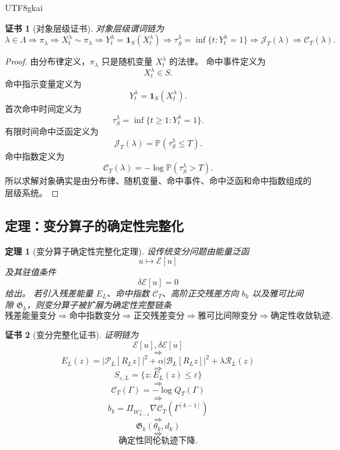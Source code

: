 \documentclass[12pt]{article}
\newtheorem{theorem}{定理}[section]
\newtheorem{Certificate}{证书}[section]
\begin{document}
\begin{CJK*}{UTF8}{gkai}
\begin{Certificate}[对象层级证书]
\label{cert:tex55-object-hierarchy-value}
对象层级谓词链为
\[
  \lambda\in\Lambda
  \Longrightarrow
  \pi_\lambda
  \Longrightarrow
  X_t^\lambda\sim\pi_\lambda
  \Longrightarrow
  Y_t^\lambda=\mathbf 1_S(X_t^\lambda)
  \Longrightarrow
  \tau_S^\lambda=\inf\{t:Y_t^\lambda=1\}
  \Longrightarrow
  \mathcal J_T(\lambda)
  \Longrightarrow
  \mathcal C_T(\lambda).
\]
\end{Certificate}

\begin{proof}
由分布律定义，\(\pi_\lambda\) 只是随机变量 \(X_t^\lambda\) 的法律。
命中事件定义为
\[
  X_t^\lambda\in S.
\]
命中指示变量定义为
\[
  Y_t^\lambda=\mathbf 1_S(X_t^\lambda).
\]
首次命中时间定义为
\[
  \tau_S^\lambda=\inf\{t\ge1:Y_t^\lambda=1\}.
\]
有限时间命中泛函定义为
\[
  \mathcal J_T(\lambda)=\mathbb P(\tau_S^\lambda\le T).
\]
命中指数定义为
\[
  \mathcal C_T(\lambda)=-\log\mathbb P(\tau_S^\lambda>T).
\]
所以求解对象确实是由分布律、随机变量、命中事件、命中泛函和命中指数组成的层级系统。
\end{proof}

\subsection{定理：变分算子的确定性完整化}
\label{subsec:tex55-variational-completion-theorem}

\begin{theorem}[变分算子确定性完整化定理]
\label{thm:tex55-variational-operator-completion}
设传统变分问题由能量泛函
\[
  u\mapsto\mathcal E[u]
\]
及其驻值条件
\[
  \delta\mathcal E[u]=0
\]
给出。
若引入残差能量 \(E_L\)、命中指数 \(\mathcal C_T\)、高阶正交残差方向 \(b_k\)
以及雅可比间隙 \(\mathfrak G_k\)，则变分算子被扩展为确定性完整链条
\[
  \boxed{
  \text{残差能量变分}
  \Rightarrow
  \text{命中指数变分}
  \Rightarrow
  \text{正交残差变分}
  \Rightarrow
  \text{雅可比间隙变分}
  \Rightarrow
  \text{确定性收敛轨迹}.
  }
\]
\end{theorem}

\begin{Certificate}[变分完整化证书]
\label{cert:tex55-variational-operator-completion}
证明链为
\[
  \mathcal E[u],\delta\mathcal E[u]
\]
\[
  \Longrightarrow
\]
\[
  E_L(z)
  =
  |\mathcal P_L[R_Lz]|^2
  +
  \alpha|\mathcal B_L[R_Lz]|^2
  +
  \lambda\mathcal R_L(z)
\]
\[
  \Longrightarrow
\]
\[
  S_{\varepsilon,L}=\{z:E_L(z)\le\varepsilon\}
\]
\[
  \Longrightarrow
\]
\[
  \mathcal C_T(\Gamma)=-\log Q_T(\Gamma)
\]
\[
  \Longrightarrow
\]
\[
  b_k=
  \Pi_{\mathcal W_{k-1}^{\perp}}
  \nabla\mathcal C_T(\Gamma^{[k-1]})
\]
\[
  \Longrightarrow
\]
\[
  \mathfrak G_k(\theta_k,d_k)
\]
\[
  \Longrightarrow
\]
\[
  \text{确定性同伦轨迹下降}.
\]
\end{Certificate}


\end{CJK*}
\end{document}
